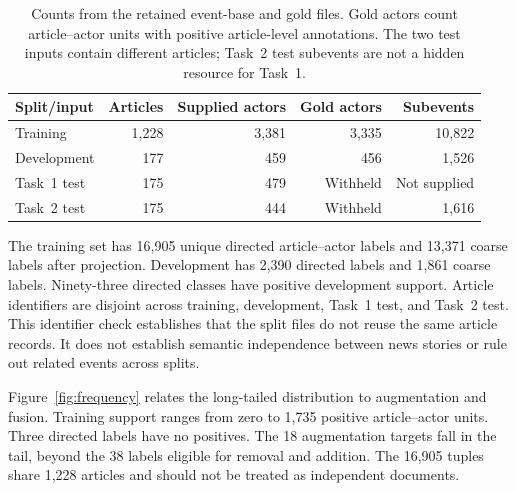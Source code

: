 \documentclass[12pt,a4paper]{article}
\begin{document}
\begin{table}[htbp]
\centering\small
\caption{Counts from the retained event-base and gold files. Gold actors count article--actor units with positive article-level annotations. The two test inputs contain different articles; Task~2 test subevents are not a hidden resource for Task~1.}
\label{tab:data}
\begin{tabularx}{\textwidth}{@{}Yrrrr@{}}
\toprule
Split/input & Articles & Supplied actors & Gold actors & Subevents \\
\midrule
Training & 1,228 & 3,381 & 3,335 & 10,822 \\
Development & 177 & 459 & 456 & 1,526 \\
Task~1 test & 175 & 479 & Withheld & Not supplied \\
\midrule
Task~2 test & 175 & 444 & Withheld & 1,616 \\
\bottomrule
\end{tabularx}
\end{table}

The training set has 16,905 unique directed article--actor labels and 13,371 coarse labels after projection. Development has 2,390 directed labels and 1,861 coarse labels. Ninety-three directed classes have positive development support. Article identifiers are disjoint across training, development, Task~1 test, and Task~2 test. This identifier check establishes that the split files do not reuse the same article records. It does not establish semantic independence between news stories or rule out related events across splits.

Figure~\ref{fig:frequency} relates the long-tailed distribution to augmentation and fusion. Training support ranges from zero to 1,735 positive article--actor units. Three directed labels have no positives. The 18 augmentation targets fall in the tail, beyond the 38 labels eligible for removal and addition. The 16,905 tuples share 1,228 articles and should not be treated as independent documents.
\end{document}
